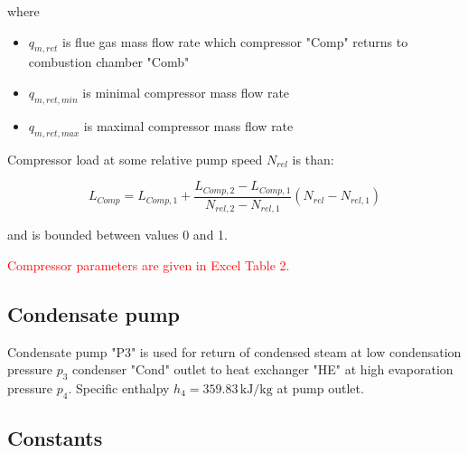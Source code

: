 \documentclass{article}
\begin{document}
	\noindent
	where
	
	\begin{itemize}
		\item $q_{m,ret}$ is flue gas mass flow rate which compressor "Comp" 
		returns to combustion chamber "Comb"
		\item $q_{m,ret,min}$ is minimal compressor mass flow rate
		\item $q_{m,ret,max}$ is maximal compressor mass flow rate	
	\end{itemize}

	\noindent
	Compressor load at some relative pump speed $N_{rel}$ is than:
	
	\begin{equation}\label{eq:compressor_load_rel}
		L_{Comp} = L_{Comp,1} + \frac{L_{Comp,2} - L_{Comp,1}}{N_{rel,2} - N_{rel,1}} \left( N_{rel} - N_{rel,1}\right)
	\end{equation}
	
	\noindent
	and is bounded between values 0 and 1.
	
	\noindent
	\textcolor{red}{Compressor parameters are given in Excel Table 2.}
	
	\subsection{Condensate pump}

	Condensate pump "P3" is used for return of condensed steam at low 
	condensation pressure $p_3$ condenser "Cond" outlet to heat exchanger "HE" 
	at high evaporation pressure $p_4$.
	Specific enthalpy $h_4 = 359.83 \,\textrm{kJ/kg}$ at pump outlet.

	\subsection{Constants} \label{sec:const}
	
\end{document}
